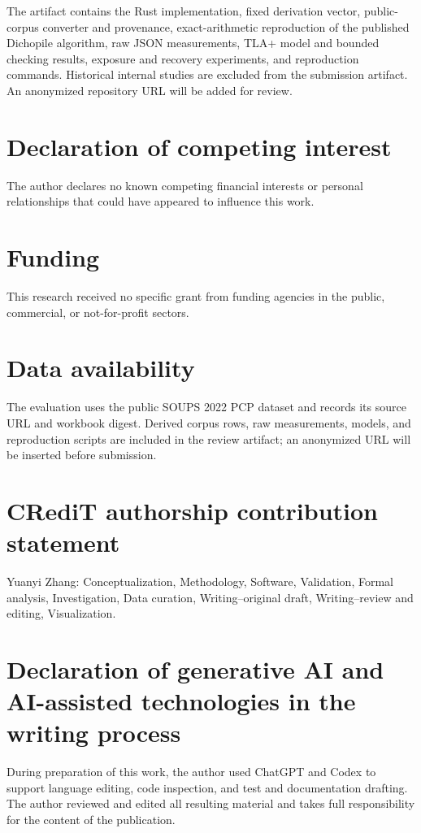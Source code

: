 \documentclass[preprint,12pt]{elsarticle}
\begin{document}
The artifact contains the Rust implementation, fixed derivation vector,
public-corpus converter and provenance, exact-arithmetic reproduction of the
published Dichopile algorithm, raw JSON measurements, TLA+ model and bounded
checking results, exposure and recovery experiments, and reproduction commands.
Historical internal studies are excluded from the submission artifact. An
anonymized repository URL will be added for review.

\section*{Declaration of competing interest}

The author declares no known competing financial interests or personal
relationships that could have appeared to influence this work.

\section*{Funding}

This research received no specific grant from funding agencies in the public,
commercial, or not-for-profit sectors.

\section*{Data availability}

The evaluation uses the public SOUPS 2022 PCP dataset and records its source
URL and workbook digest. Derived corpus rows, raw measurements, models, and
reproduction scripts are included in the review artifact; an anonymized URL
will be inserted before submission.

\section*{CRediT authorship contribution statement}

Yuanyi Zhang: Conceptualization, Methodology, Software, Validation, Formal
analysis, Investigation, Data curation, Writing--original draft,
Writing--review and editing, Visualization.

\section*{Declaration of generative AI and AI-assisted technologies in the writing process}

During preparation of this work, the author used ChatGPT and Codex to support
language editing, code inspection, and test and documentation drafting. The
author reviewed and edited all resulting material and takes full responsibility
for the content of the publication.



\end{document}

